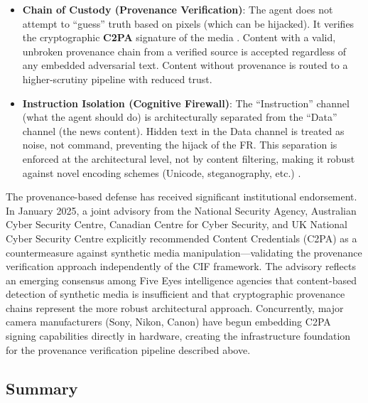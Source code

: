 \documentclass[
]{article}
\providecommand{\tightlist}{%
  \setlength{\itemsep}{0pt}\setlength{\parskip}{0pt}}
\begin{document}
\begin{itemize}
\tightlist
\item
  \textbf{Chain of Custody (Provenance Verification)}: The agent does
  not attempt to ``guess'' truth based on pixels (which can be
  hijacked). It verifies the cryptographic \textbf{C2PA} signature of
  the media \cite{c2pa2022standard}. Content with a valid, unbroken
  provenance chain from a verified source is accepted regardless of any
  embedded adversarial text. Content without provenance is routed to a
  higher-scrutiny pipeline with reduced trust.
\item
  \textbf{Instruction Isolation (Cognitive Firewall)}: The
  ``Instruction'' channel (what the agent should do) is architecturally
  separated from the ``Data'' channel (the news content). Hidden text in
  the Data channel is treated as noise, not command, preventing the
  hijack of the FR. This separation is enforced at the architectural
  level, not by content filtering, making it robust against novel
  encoding schemes (Unicode, steganography, etc.)
  \cite{lazer2018science}.
\end{itemize}

The provenance-based defense has received significant institutional
endorsement. In January 2025, a joint advisory from the National
Security Agency, Australian Cyber Security Centre, Canadian Centre for
Cyber Security, and UK National Cyber Security Centre \cite{nsa2025c2pa}
explicitly recommended Content Credentials (C2PA) as a countermeasure
against synthetic media manipulation---validating the provenance
verification approach independently of the CIF framework. The advisory
reflects an emerging consensus among Five Eyes intelligence agencies
that content-based detection of synthetic media is insufficient and that
cryptographic provenance chains represent the more robust architectural
approach. Concurrently, major camera manufacturers (Sony, Nikon, Canon)
have begun embedding C2PA signing capabilities directly in hardware,
creating the infrastructure foundation for the provenance verification
pipeline described above.

\subsection{Summary}\label{summary-9}
\end{document}
